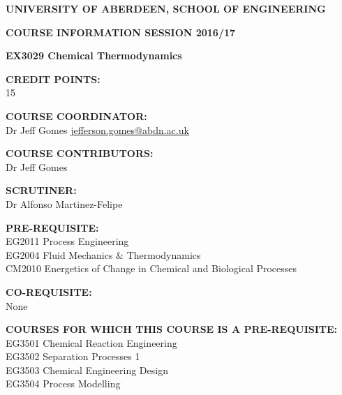 \documentclass[12pts,a4paper,amsmath,amssymb,floatfix]{article}%
\begin{document}
\begin{center}
{\large {\bf UNIVERSITY OF ABERDEEN, SCHOOL OF ENGINEERING}}
\medskip

{\large {\bf COURSE INFORMATION SESSION 2016/17}}
\bigskip 

{\Large {\bf EX3029 Chemical Thermodynamics}}
\end{center}

\bigskip
\begin{flushleft}

{\large {\bf CREDIT POINTS:}}\\
\hspace{0.8cm}15
\medskip

{\large {\bf COURSE COORDINATOR: }}\\
\hspace{0.8cm}Dr Jeff Gomes \hspace{1.5cm} \href{mailto:jefferson.gomes@abdn.ac.uk}{jefferson.gomes@abdn.ac.uk}
\medskip 

{\large {\bf COURSE CONTRIBUTORS:}}\\
\hspace{0.8cm} Dr Jeff Gomes
\medskip

{\large {\bf SCRUTINER:}}\\
\hspace{0.8cm}Dr Alfonso Martinez-Felipe
\medskip  

{\large {\bf PRE-REQUISITE:}}\\
\hspace{0.8cm}EG2011 Process Engineering\\
\hspace{0.8cm}EG2004 Fluid Mechanics $\&$ Thermodynamics\\
\hspace{0.8cm}CM2010 Energetics of Change in Chemical and Biological Processes

\medskip

{\large {\bf CO-REQUISITE:}}\\
\hspace{0.8cm}None
\medskip 

{\large {\bf COURSES FOR WHICH THIS COURSE IS A PRE-REQUISITE:}}\\
\hspace{0.8cm}EG3501 Chemical Reaction Engineering\\
\hspace{0.8cm}EG3502 Separation Processes 1\\
\hspace{0.8cm}EG3503 Chemical Engineering Design\\
\hspace{0.8cm}EG3504 Process Modelling\\ 
\end{flushleft}
\end{document}
